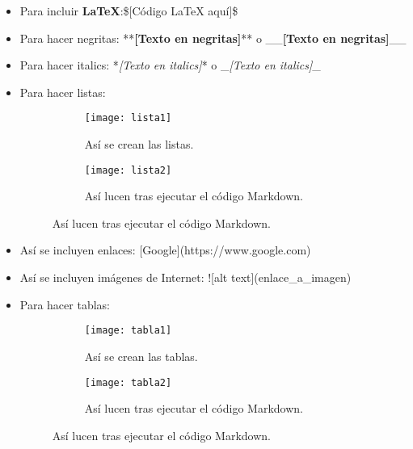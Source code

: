 \documentclass{article}
\begin{document}
        \begin{itemize}
            \item Para incluir \textbf{LaTeX}:\$[C\'{o}digo LaTeX aqu\'{i}]\$
            \item Para hacer negritas: **\textbf{[Texto en negritas]}** o \_\_\textbf{[Texto en negritas]}\_\_
            \item Para hacer italics: *\textit{[Texto en italics]}* o \_\textit{[Texto en italics]}\_ 
            \item Para hacer listas: 
            \begin{figure}[H]
                \begin{subfigure}{0.5\textwidth}
                    \texttt{[image: lista1]}
                    \caption{As\'{i} se crean las listas.}
                \end{subfigure}
                \begin{subfigure}{0.5\textwidth}
                    \texttt{[image: lista2]}
                    \caption{As\'{i} lucen tras ejecutar el c\'{o}digo Markdown.}
                \end{subfigure}
            \end{figure}

            \item As\'{i} se incluyen enlaces: [Google](https://www.google.com)

            \item As\'{i} se incluyen im\'{a}genes de Internet: ![alt text](enlace\_a\_imagen)
            \item Para hacer tablas:
            \begin{figure}[H]
                \begin{subfigure}{0.5\textwidth}
                    \texttt{[image: tabla1]}
                    \caption{As\'{i} se crean las tablas.}
                \end{subfigure}
                \begin{subfigure}{0.5\textwidth}
                    \texttt{[image: tabla2]}
                    \caption{As\'{i} lucen tras ejecutar el c\'{o}digo Markdown.}
                \end{subfigure}
            \end{figure}
        \end{itemize}
    \newpage
\end{document}
